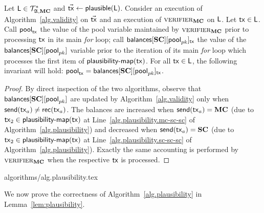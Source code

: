 \begin{lemma}\label{lem:plausible-balances}
  Let $\mathsf{L} \in \mathcal{T}_{\mathfrak{A},\mathbf{MC}}^*$ and $\vec{\mathsf{tx}} \gets \textsf{plausible}(\mathsf{L})$.
  Consider an execution of
  Algorithm~\ref{alg.validity} on $\vec{\mathsf{tx}}$ and an execution of
  $\textsc{verifier}_{\mathbf{MC}}$ on $\mathsf{L}$. Let $\mathsf{tx} \in \mathsf{L}$. Call
  $\textsf{pool}_{\mathsf{tx}}$ the value of the \textsf{pool} variable maintained by
  $\textsc{verifier}_{\mathbf{MC}}$ prior to processing $\mathsf{tx}$ in its
  main \emph{for} loop; call
  $\textsf{balances}[\mathbf{SC}][\textsf{pool}_{pk}]_{\mathsf{tx}}$ the value of the
  $\textsf{balances}[\mathbf{SC}][\textsf{pool}_{pk}]$ variable prior to the iteration
  of its main \emph{for} loop which processes the first item of
  $\textsf{plausibility-map}(\mathsf{tx})$. For all $\mathsf{tx} \in \mathsf{L}$, the following
  invariant will hold: $\textsf{pool}_{\mathsf{tx}} =
  \textsf{balances}[\mathbf{SC}][\textsf{pool}_{pk}]_{\mathsf{tx}}$.
\end{lemma}

\begin{proof}
  By direct inspection of the two algorithms, observe that
  $\textsf{balances}[\mathbf{SC}][\textsf{pool}_{pk}]$ are updated by
  Algorithm~\ref{alg.validity} only when $\mathsf{send}(\mathsf{tx}_a) \neq \mathsf{rec}(\mathsf{tx}_a)$. The
  balances are increased when $\mathsf{send}(\mathsf{tx}_a) = \mathbf{MC}$ (due to $\mathsf{tx}_2 \in
  \textsf{plausibility-map}(\mathsf{tx})$ at Line~\ref{alg.plausibility.mc-sc-sc} of
  Algorithm~\ref{alg.plausibility}) and decreased when $\mathsf{send}(\mathsf{tx}_a) = \mathbf{SC}$ (due
  to $\mathsf{tx}_2 \in \textsf{plausibility-map}(\mathsf{tx})$ at
  Line~\ref{alg.plausibility.sc-sc-sc} of Algorithm~\ref{alg.plausibility}).
  Exactly the same accounting is performed by $\textsc{verifier}_{\mathbf{MC}}$ when the
  respective $\mathsf{tx}$ is processed.
\end{proof}

{algorithms/alg.plausibility.tex}

We now prove the correctness of Algorithm~\ref{alg.plausibility} in
Lemma~\ref{lem:plausibility}.


